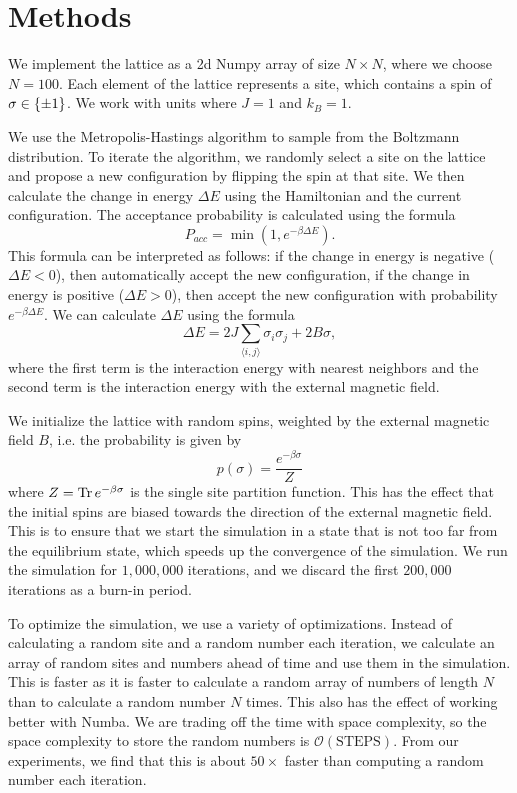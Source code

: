 \documentclass[
 reprint,
 amsmath,
 amssymb,
 aps,
]{revtex4-2}
\begin{document}
\section{Methods}
\label{sec:methods}

We implement the lattice as a 2d Numpy array of size $ N\times N $,
where we choose $ N = 100 $.
Each element of the lattice represents a site,
which contains a spin of $ \sigma \in \qty{\pm 1} $.
We work with units where $ J = 1 $ and $ k_{B} = 1 $.

We use the Metropolis-Hastings algorithm to sample from the Boltzmann
distribution.
To iterate the algorithm,
we randomly select a site on the lattice and propose a new configuration
by flipping the spin at that site.
We then calculate the change in energy $ \Delta E $ using the Hamiltonian
and the current configuration.
The acceptance probability is calculated using the formula
\begin{equation}
P_{acc} = \min\left(1, e^{-\beta \Delta E}\right).
\end{equation}
This formula can be interpreted as follows:
if the change in energy is negative ($ \Delta E < 0 $),
then automatically accept the new configuration,
if the change in energy is positive ($ \Delta E > 0 $),
then accept the new configuration with probability
$ e^{-\beta \Delta E} $.
We can calculate $ \Delta E $ using the formula
\begin{equation}
\Delta E = 2J \sum_{\langle i,j \rangle} \sigma_{i} \sigma_{j} + 2B \sigma, 
\end{equation}
where the first term is the interaction energy with nearest neighbors
and the second term is the interaction energy with the external magnetic field.

We initialize the lattice with random spins, weighted by 
the external magnetic field $ B $, i.e.
the probability is given by 
\begin{equation}
p(\sigma) = \frac{e^{-\beta \sigma}}{Z}
\end{equation}
where $ Z = \Tr e^{-\beta \sigma} $ is the single site partition function.
This has the effect that the initial spins are 
biased towards the direction of the external magnetic field.
This is to ensure that we start the simulation in a state that is not too far
from the equilibrium state, which speeds up the convergence of the simulation.
We run the simulation for $ 1,000,000 $ iterations,
and we discard the first $ 200,000 $ iterations as a burn-in period.

To optimize the simulation, we use a variety of optimizations.
Instead of calculating a random site and a random number each iteration,
we calculate an array of random sites and numbers ahead of time and
use them in the simulation.
This is faster as it is faster to calculate a random array of numbers of length
$ N $ than to calculate a random number $ N $ times.
This also has the effect of working better with Numba.
We are trading off the time with space complexity,
so the space complexity to store the random numbers is 
$ \mathcal{O}(\mathrm{STEPS}) $.
From our experiments, we find that this is about $ 50\times $ faster than
computing a random number each iteration.
\end{document}

